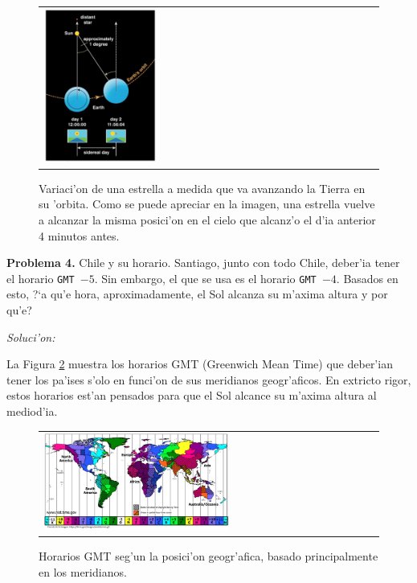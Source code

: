\documentclass{article}
\begin{document}
\begin{figure}[!ht]
\begin{center}
\begin{tabular}{ll}
  \includegraphics[width=0.35\textwidth]{sidereal_day_positions.png}
\end{tabular}
\caption{Variaci'on de una estrella a medida que va avanzando la Tierra en su 'orbita. Como se puede apreciar en la imagen, una estrella vuelve a alcanzar la misma posici'on en el cielo que alcanz'o el d'ia anterior 4 minutos antes.}\label{posicion_dia_sideral}
\end{center} 
\end{figure}

\vspace{3mm}

\textbf{Problema 4.} Chile y su horario. Santiago, junto con todo Chile, deber'ia tener el horario \texttt{GMT $-5$}. Sin embargo, el que se usa es el horario \texttt{GMT $-4$}. Basados en esto, ?`a qu'e hora, aproximadamente, el Sol alcanza su m'axima altura y por qu'e?

\emph{Soluci'on: }

La Figura \ref{GMT} muestra los horarios GMT (Greenwich Mean Time) que deber'ian tener los pa'ises s'olo en funci'on de sus meridianos geogr'aficos. En extricto rigor, estos horarios est'an pensados para que el Sol alcance su m'axima altura al mediod'ia. 

\begin{figure}[!ht]
\begin{center}
\begin{tabular}{ll}
  \includegraphics[width=0.58\textwidth]{gmt.png}
\end{tabular}
\caption{Horarios GMT seg'un la posici'on geogr'afica, basado principalmente en los meridianos.}\label{GMT}
\end{center} 
\end{figure}
\end{document}
